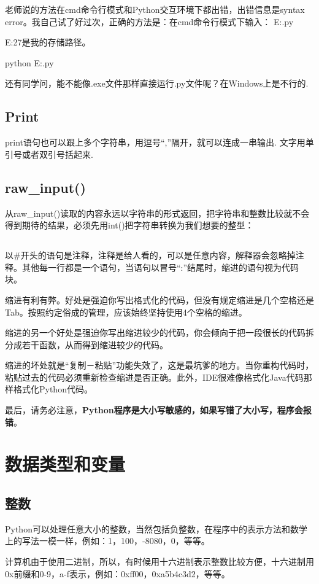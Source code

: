 老师说的方法在cmd命令行模式和Python交互环境下都出错，出错信息是syntax error。我自己试了好过次，正确的方法是：在cmd命令行模式下输入：
E:\hello.py

E:\python27是我的存储路径。

python E:\hello.py

还有同学问，能不能像.exe文件那样直接运行.py文件呢？在Windows上是不行的.
\section{Print}
print语句也可以跟上多个字符串，用逗号“,”隔开，就可以连成一串输出.
文字用单引号或者双引号括起来.
\section{raw_input()}
从raw_input()读取的内容永远以字符串的形式返回，把字符串和整数比较就不会得到期待的结果，必须先用int()把字符串转换为我们想要的整型：
\section{}
以#开头的语句是注释，注释是给人看的，可以是任意内容，解释器会忽略掉注释。其他每一行都是一个语句，当语句以冒号“:”结尾时，缩进的语句视为代码块。

缩进有利有弊。好处是强迫你写出格式化的代码，但没有规定缩进是几个空格还是Tab。按照约定俗成的管理，应该始终坚持使用4个空格的缩进。

缩进的另一个好处是强迫你写出缩进较少的代码，你会倾向于把一段很长的代码拆分成若干函数，从而得到缩进较少的代码。

缩进的坏处就是“复制－粘贴”功能失效了，这是最坑爹的地方。当你重构代码时，粘贴过去的代码必须重新检查缩进是否正确。此外，IDE很难像格式化Java代码那样格式化Python代码。

最后，请务必注意，\textbf{Python程序是大小写敏感的，如果写错了大小写，程序会报错}。
\chapter{数据类型和变量}
\section{整数}
Python可以处理任意大小的整数，当然包括负整数，在程序中的表示方法和数学上的写法一模一样，例如：1，100，-8080，0，等等。

计算机由于使用二进制，所以，有时候用十六进制表示整数比较方便，十六进制用0x前缀和0-9，a-f表示，例如：0xff00，0xa5b4c3d2，等等。
